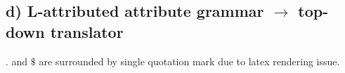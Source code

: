 \documentclass[12pt, A4]{article}
\begin{document}
    \newpage
    \subsection*{d) L-attributed attribute grammar $\rightarrow$ top-down translator}
    
    $.$ and $\$$ are surrounded by single quotation mark due to latex rendering issue.\\
    
    \inputminted{c++}{QuestionB/S.cpp}
    
    \inputminted{c++}{QuestionB/R.cpp}
    
    \inputminted{c++}{QuestionB/L.cpp}
    
    \inputminted{c++}{QuestionB/Ls.cpp}
    
    \inputminted{c++}{QuestionB/B.cpp}
	
\end{document}
